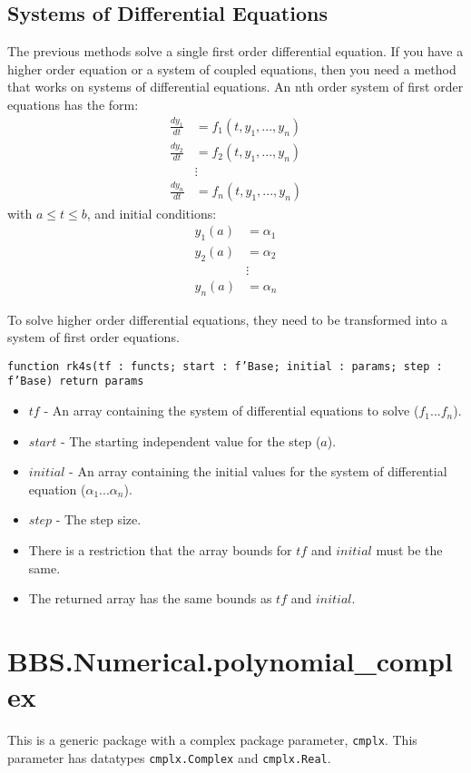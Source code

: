 \documentclass[10pt, openany]{book}
\newcommand{\function}[1]{\texttt{#1}}
\newcommand{\datatype}[1]{\texttt{#1}}
\begin{document}
\subsection{Systems of Differential Equations}
The previous methods solve a single first order differential equation.  If you have a higher order equation or a system of coupled equations, then you need a method that works on systems of differential equations.  An nth order system of first order equations has the form:
\begin{align*}
  \frac{dy_1}{dt} &= f_1(t, y_1, ..., y_n) \\
  \frac{dy_2}{dt} &= f_2(t, y_1, ..., y_n) \\
  &\vdots\\
  \frac{dy_n}{dt} &= f_n(t, y_1, ..., y_n)
\end{align*}
with $a\leq t\leq b$, and initial conditions:
\begin{align*}
  y_1(a) &= \alpha_1 \\
  y_2(a) &= \alpha_2 \\
  &\vdots \\
  y_n(a) &= \alpha_n
\end{align*}

To solve higher order differential equations, they need to be transformed into a system of first order equations.

\function{function rk4s(tf : functs; start : f'Base; initial : params; step : f'Base) return params}
\begin{itemize}
  \item $tf$ - An array containing the system of differential equations to solve ($f_1 ... f_n$).
  \item $start$ - The starting independent value for the step ($a$).
  \item $initial$ - An array containing the initial values for the system of differential equation ($\alpha_1 ... \alpha_n$).
  \item $step$ - The step size.
  \item There is a restriction that the array bounds for $tf$ and $initial$ must be the same.
  \item The returned array has the same bounds as $tf$ and $initial$.
\end{itemize}

\section{BBS.Numerical.polynomial\_complex}
This is a generic package with a complex package parameter, \datatype{cmplx}.  This parameter has datatypes \datatype{cmplx.Complex} and \datatype{cmplx.Real}.
\end{document}
